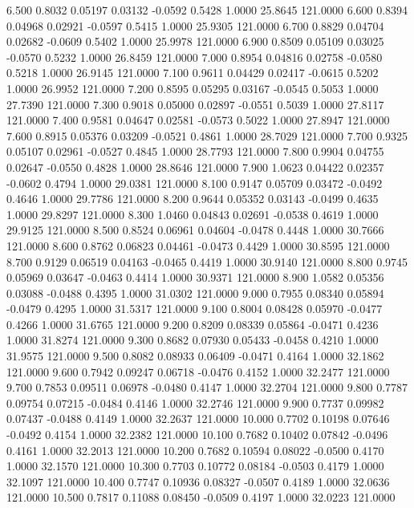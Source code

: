    6.500   0.8032   0.05197   0.03132  -0.0592   0.5428   1.0000  25.8645 121.0000
   6.600   0.8394   0.04968   0.02921  -0.0597   0.5415   1.0000  25.9305 121.0000
   6.700   0.8829   0.04704   0.02682  -0.0609   0.5402   1.0000  25.9978 121.0000
   6.900   0.8509   0.05109   0.03025  -0.0570   0.5232   1.0000  26.8459 121.0000
   7.000   0.8954   0.04816   0.02758  -0.0580   0.5218   1.0000  26.9145 121.0000
   7.100   0.9611   0.04429   0.02417  -0.0615   0.5202   1.0000  26.9952 121.0000
   7.200   0.8595   0.05295   0.03167  -0.0545   0.5053   1.0000  27.7390 121.0000
   7.300   0.9018   0.05000   0.02897  -0.0551   0.5039   1.0000  27.8117 121.0000
   7.400   0.9581   0.04647   0.02581  -0.0573   0.5022   1.0000  27.8947 121.0000
   7.600   0.8915   0.05376   0.03209  -0.0521   0.4861   1.0000  28.7029 121.0000
   7.700   0.9325   0.05107   0.02961  -0.0527   0.4845   1.0000  28.7793 121.0000
   7.800   0.9904   0.04755   0.02647  -0.0550   0.4828   1.0000  28.8646 121.0000
   7.900   1.0623   0.04422   0.02357  -0.0602   0.4794   1.0000  29.0381 121.0000
   8.100   0.9147   0.05709   0.03472  -0.0492   0.4646   1.0000  29.7786 121.0000
   8.200   0.9644   0.05352   0.03143  -0.0499   0.4635   1.0000  29.8297 121.0000
   8.300   1.0460   0.04843   0.02691  -0.0538   0.4619   1.0000  29.9125 121.0000
   8.500   0.8524   0.06961   0.04604  -0.0478   0.4448   1.0000  30.7666 121.0000
   8.600   0.8762   0.06823   0.04461  -0.0473   0.4429   1.0000  30.8595 121.0000
   8.700   0.9129   0.06519   0.04163  -0.0465   0.4419   1.0000  30.9140 121.0000
   8.800   0.9745   0.05969   0.03647  -0.0463   0.4414   1.0000  30.9371 121.0000
   8.900   1.0582   0.05356   0.03088  -0.0488   0.4395   1.0000  31.0302 121.0000
   9.000   0.7955   0.08340   0.05894  -0.0479   0.4295   1.0000  31.5317 121.0000
   9.100   0.8004   0.08428   0.05970  -0.0477   0.4266   1.0000  31.6765 121.0000
   9.200   0.8209   0.08339   0.05864  -0.0471   0.4236   1.0000  31.8274 121.0000
   9.300   0.8682   0.07930   0.05433  -0.0458   0.4210   1.0000  31.9575 121.0000
   9.500   0.8082   0.08933   0.06409  -0.0471   0.4164   1.0000  32.1862 121.0000
   9.600   0.7942   0.09247   0.06718  -0.0476   0.4152   1.0000  32.2477 121.0000
   9.700   0.7853   0.09511   0.06978  -0.0480   0.4147   1.0000  32.2704 121.0000
   9.800   0.7787   0.09754   0.07215  -0.0484   0.4146   1.0000  32.2746 121.0000
   9.900   0.7737   0.09982   0.07437  -0.0488   0.4149   1.0000  32.2637 121.0000
  10.000   0.7702   0.10198   0.07646  -0.0492   0.4154   1.0000  32.2382 121.0000
  10.100   0.7682   0.10402   0.07842  -0.0496   0.4161   1.0000  32.2013 121.0000
  10.200   0.7682   0.10594   0.08022  -0.0500   0.4170   1.0000  32.1570 121.0000
  10.300   0.7703   0.10772   0.08184  -0.0503   0.4179   1.0000  32.1097 121.0000
  10.400   0.7747   0.10936   0.08327  -0.0507   0.4189   1.0000  32.0636 121.0000
  10.500   0.7817   0.11088   0.08450  -0.0509   0.4197   1.0000  32.0223 121.0000
